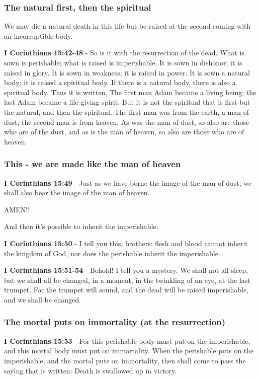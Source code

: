 \documentclass[11pt]{article}
\begin{document}
\subsubsection{The natural first, then the spiritual}
\label{sec:org325e777}
We may die a natural death in this life but be raised at the second coming with an incorruptible body.

\textbf{I Corinthians 15:42-48} - So is it with the resurrection of the dead. What is sown is perishable; what is raised is imperishable.  It is sown in dishonor; it is raised in glory. It is sown in weakness; it is raised in power.  It is sown a natural body; it is raised a spiritual body. If there is a natural body, there is also a spiritual body.  Thus it is written, The first man Adam became a living being; the last Adam became a life-giving spirit.  But it is not the spiritual that is first but the natural, and then the spiritual.  The first man was from the earth, a man of dust; the second man is from heaven.  As was the man of dust, so also are those who are of the dust, and as is the man of heaven, so also are those who are of heaven.

\subsubsection{This - we are made like the man of heaven}
\label{sec:org2355f12}
\textbf{I Corinthians 15:49} - Just as we have borne the image of the man of dust, we shall also bear the image of the man of heaven.

AMEN!!

And then it's possible to inherit the imperishable:

\textbf{I Corinthians 15:50} - I tell you this, brothers: flesh and blood cannot inherit the kingdom of God, nor does the perishable inherit the imperishable.

\textbf{I Corinthians 15:51-54} - Behold! I tell you a mystery. We shall not all sleep, but we shall all be changed, in a moment, in the twinkling of an eye, at the last trumpet. For the trumpet will sound, and the dead will be raised imperishable, and we shall be changed.

\subsubsection{The mortal puts on immortality (at the resurrection)}
\label{sec:orgb67af97}
\textbf{I Corinthians 15:53} - For this perishable body must put on the imperishable, and this mortal body must put on immortality. When the perishable puts on the imperishable, and the mortal puts on immortality, then shall come to pass the saying that is written: Death is swallowed up in victory.
\end{document}
